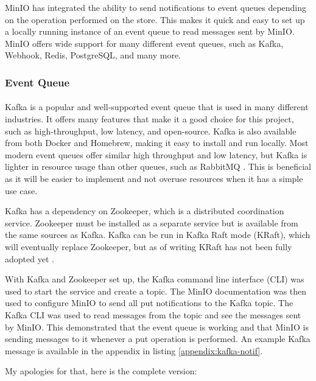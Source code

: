 \documentclass[12pt, conference, final, a4paper, onecolumn, compsoc]{IEEEtran}
\begin{document}

MinIO has integrated the ability to send notifications to event queues depending
on the operation performed on the store. This makes it quick and easy to set up
a locally running instance of an event queue to read messages sent by MinIO.
MinIO offers wide support for many different event queues, such as Kafka,
Webhook, Redis, PostgreSQL, and many more.

\subsubsection*{Event Queue}
\paragraph{}

Kafka is a popular and well-supported event queue that is used in many different
industries. It offers many features that make it a good choice for this project,
such as high-throughput, low latency, and open-source. Kafka is also available
from both Docker and Homebrew, making it easy to install and run locally. Most
modern event queues offer similar high throughput and low latency, but Kafka is
lighter in resource usage than other queues, such as RabbitMQ
\citep{kafka-rabbitmq}. This is beneficial as it will be easier to implement and
not overuse resources when it has a simple use case.

Kafka has a dependency on Zookeeper, which is a distributed coordination
service. Zookeeper must be installed as a separate service but is available from
the same sources as Kafka. Kafka can be run in Kafka Raft mode (KRaft), which
will eventually replace Zookeeper, but as of writing KRaft has not been fully
adopted yet \citep{kafka-raft}.

With Kafka and Zookeeper set up, the Kafka command line interface (CLI) was used
to start the service and create a topic. The MinIO documentation was then used
to configure MinIO to send all put notifications to the Kafka topic. The Kafka
CLI was used to read messages from the topic and see the messages sent by MinIO.
This demonstrated that the event queue is working and that MinIO is sending
messages to it whenever a put operation is performed. An example Kafka message
is available in the appendix in listing \ref{appendix:kafka-notif}.


My apologies for that, here is the complete version:
\end{document}
